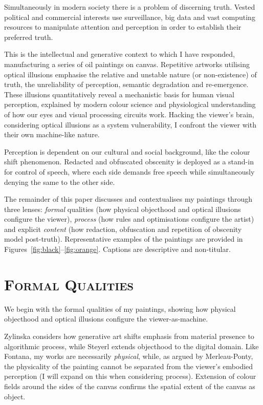 \documentclass[12pt]{article}
\begin{document}
Simultaneously in modern society there is a problem of discerning
truth.\cite{keyes2004posttruth,mcintyre2018posttruth} Vested
political and commercial interests use surveillance, big data and vast
computing resources to manipulate attention and perception in order to
establish their preferred truth.

This is the intellectual and generative context to which I have
responded, manufacturing a series of oil paintings on
canvas. Repetitive artworks utilising optical illusions emphasise the
relative and unstable nature (or non-existence) of truth, the
unreliability of perception, semantic degradation and
re-emergence. These illusions quantitatively reveal a mechanistic
basis for human visual perception, explained by modern colour science
and physiological understanding of how our eyes and visual processing
circuits work. Hacking the viewer's brain, considering optical
illusions as a system vulnerability, I confront the viewer with their
own machine-like nature.

Perception is dependent on our cultural and social background, like
the colour shift phenomenon. Redacted and obfuscated obscenity is
deployed as a stand-in for control of speech, where each side demands
free speech while simultaneously denying the same to the other side.

The remainder of this paper discusses and contextualises my paintings
through three lenses: \emph{formal} qualities (how physical objecthood
and optical illusions configure the viewer), \emph{process} (how rules
and optimisations configure the artist) and explicit \emph{content}
(how redaction, obfuscation and repetition of obscenity model
post-truth). Representative examples of the paintings are provided in
Figures~\ref{fig:black}--\ref{fig:orange}. Captions are descriptive
and non-titular.

\section{\textsc{Formal Qualities}}
We begin with the formal qualities of my paintings, showing how
physical objecthood and optical illusions configure the
viewer-as-machine.

Zylinska considers how generative art shifts emphasis from material
presence to algorithmic process,\cite{zylinska2020ai} while Steyerl
extends objecthood to the digital domain.\cite{steyerl2017duty} Like
Fontana, my works are necessarily
\emph{physical},\cite{fontana1947spatial} while, as argued by
Merleau-Ponty, the physicality of the painting cannot be separated
from the viewer's embodied perception (I will expand on this when
considering process).\cite{merleauponty1964eye} Extension of colour
fields around the sides of the canvas confirms the spatial extent of
the canvas as object.
\end{document}
